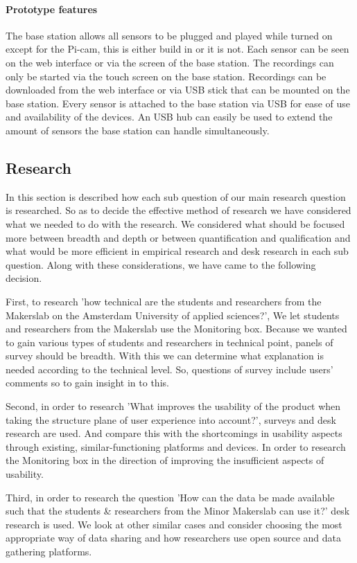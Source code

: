 \documentclass[conference]{IEEEtran}
\begin{document}
		\paragraph{Prototype features}
			The base station allows all sensors to be plugged and played while turned on except for the Pi-cam, this is either build in or it is not. Each sensor can be seen on the web interface or via the screen of the base station. The recordings can only be started via the touch screen on the base station. Recordings can be downloaded from the web interface or via USB stick that can be mounted on the base station. Every sensor is attached to the base station via USB for ease of use and availability of the devices. An USB hub can easily be used to extend the amount of sensors the base station can handle simultaneously. 
	\subsection{Research}
		In this section is described how each sub question of our main research question is researched. So as to decide the effective method of research we have considered what we needed to do with the research. We considered what should be focused more between breadth and depth or between quantification and qualification and what would be more efficient in empirical research and desk research in each sub question. Along with these considerations, we have came to the following decision. 

		First, to research 'how technical are the students and researchers from the Makerslab on the Amsterdam University of applied sciences?', We let students and researchers from the Makerslab use the Monitoring box. Because we wanted to gain various types of students and researchers in technical point, panels of survey should be breadth. With this we can determine what explanation is needed according to the technical level. So, questions of survey include users' comments so to gain insight in to this. 

		Second, in order to research 'What improves the usability of the product when taking the structure plane of user experience into account?', surveys and desk research are used. And compare this with the shortcomings in usability aspects through existing, similar-functioning platforms and devices. In order to research the Monitoring box in the direction of improving the insufficient aspects of usability.

		Third, in order to research the question 'How can the data be made available such that the students \& researchers from the Minor Makerslab can use it?' desk research is used. We look at other similar cases and consider choosing the most appropriate way of data sharing and how researchers use open source and data gathering platforms.
\end{document}
